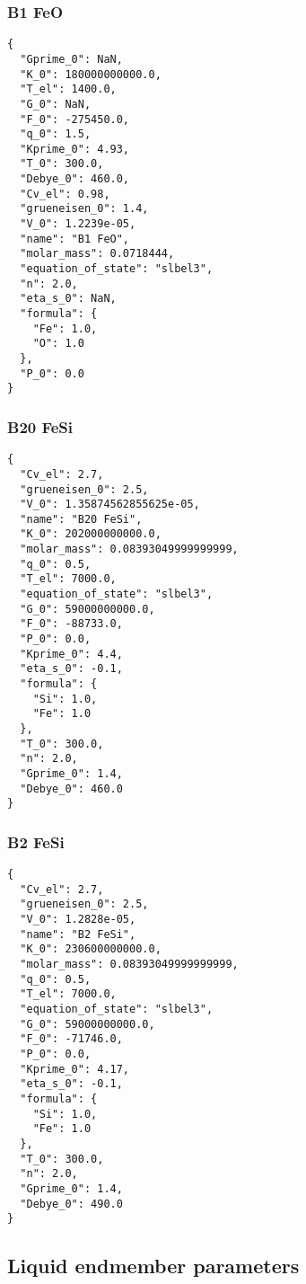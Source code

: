 \documentclass[11pt,a4paper,english]{article}
\begin{document}
\subsubsection{B1 FeO}
\begin{lstlisting}
{
  "Gprime_0": NaN, 
  "K_0": 180000000000.0, 
  "T_el": 1400.0, 
  "G_0": NaN, 
  "F_0": -275450.0, 
  "q_0": 1.5, 
  "Kprime_0": 4.93, 
  "T_0": 300.0, 
  "Debye_0": 460.0, 
  "Cv_el": 0.98, 
  "grueneisen_0": 1.4, 
  "V_0": 1.2239e-05, 
  "name": "B1 FeO", 
  "molar_mass": 0.0718444, 
  "equation_of_state": "slbel3", 
  "n": 2.0, 
  "eta_s_0": NaN, 
  "formula": {
    "Fe": 1.0, 
    "O": 1.0
  }, 
  "P_0": 0.0
}
\end{lstlisting}

\subsubsection{B20 FeSi}
\begin{lstlisting}
{
  "Cv_el": 2.7, 
  "grueneisen_0": 2.5, 
  "V_0": 1.35874562855625e-05, 
  "name": "B20 FeSi", 
  "K_0": 202000000000.0, 
  "molar_mass": 0.08393049999999999, 
  "q_0": 0.5, 
  "T_el": 7000.0, 
  "equation_of_state": "slbel3", 
  "G_0": 59000000000.0, 
  "F_0": -88733.0, 
  "P_0": 0.0, 
  "Kprime_0": 4.4, 
  "eta_s_0": -0.1, 
  "formula": {
    "Si": 1.0, 
    "Fe": 1.0
  }, 
  "T_0": 300.0, 
  "n": 2.0, 
  "Gprime_0": 1.4, 
  "Debye_0": 460.0
}
\end{lstlisting}

\subsubsection{B2 FeSi}
\begin{lstlisting}
{
  "Cv_el": 2.7, 
  "grueneisen_0": 2.5, 
  "V_0": 1.2828e-05, 
  "name": "B2 FeSi", 
  "K_0": 230600000000.0, 
  "molar_mass": 0.08393049999999999, 
  "q_0": 0.5, 
  "T_el": 7000.0, 
  "equation_of_state": "slbel3", 
  "G_0": 59000000000.0, 
  "F_0": -71746.0, 
  "P_0": 0.0, 
  "Kprime_0": 4.17, 
  "eta_s_0": -0.1, 
  "formula": {
    "Si": 1.0, 
    "Fe": 1.0
  }, 
  "T_0": 300.0, 
  "n": 2.0, 
  "Gprime_0": 1.4, 
  "Debye_0": 490.0
}
\end{lstlisting}


\subsection{Liquid endmember parameters}
\end{document}
